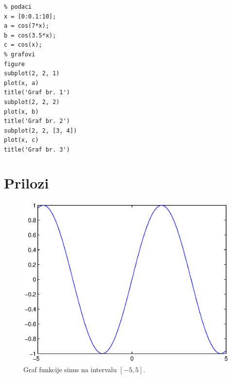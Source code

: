 \documentclass[a4paper, 10pt]{article}
\begin{document}
\begin{lstlisting}
% podaci
x = [0:0.1:10];
a = cos(7*x);
b = cos(3.5*x);
c = cos(x);
% grafovi
figure
subplot(2, 2, 1)
plot(x, a)
title('Graf br. 1')
subplot(2, 2, 2)
plot(x, b)
title('Graf br. 2')
subplot(2, 2, [3, 4])
plot(x, c)
title('Graf br. 3')
\end{lstlisting}

\clearpage


\section*{Prilozi}
\label{sec:prilozi}

\begin{figure}[!htb]
\centering
\includegraphics[width=0.95\linewidth]{slike/plot_sin_1.eps}
\caption{Graf funkcije sinus na intervalu $[-5, 5]$.}
\label{fig:plot_sin_1}
\end{figure}
\end{document}
